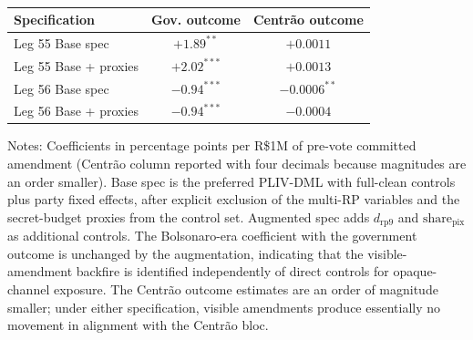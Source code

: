 \begin{table}[htbp]
\centering
\caption{}
\label{tab:t1_dual}
\begin{threeparttable}
\small
\begin{tabular}{lcc}
\toprule
Specification & Gov. outcome & Centrão outcome \\
\midrule
Leg 55 Base spec & $+1.89^{**}$ & $+0.0011$ \\
Leg 55 Base + proxies & $+2.02^{***}$ & $+0.0013$ \\
Leg 56 Base spec & $-0.94^{***}$ & $-0.0006^{**}$ \\
Leg 56 Base + proxies & $-0.94^{***}$ & $-0.0004$ \\
\bottomrule
\end{tabular}
\begin{tablenotes}
\small
\item Notes: Coefficients in percentage points per R\$1M of pre-vote committed amendment (Centrão column reported with four decimals because magnitudes are an order smaller). Base spec is the preferred PLIV-DML with full-clean controls plus party fixed effects, after explicit exclusion of the multi-RP variables and the secret-budget proxies from the control set. Augmented spec adds $d_{\mathrm{rp9}}$ and $\mathrm{share}_{\mathrm{pix}}$ as additional controls. The Bolsonaro-era coefficient with the government outcome is unchanged by the augmentation, indicating that the visible-amendment backfire is identified independently of direct controls for opaque-channel exposure. The Centrão outcome estimates are an order of magnitude smaller; under either specification, visible amendments produce essentially no movement in alignment with the Centrão bloc.
\end{tablenotes}
\end{threeparttable}
\end{table}